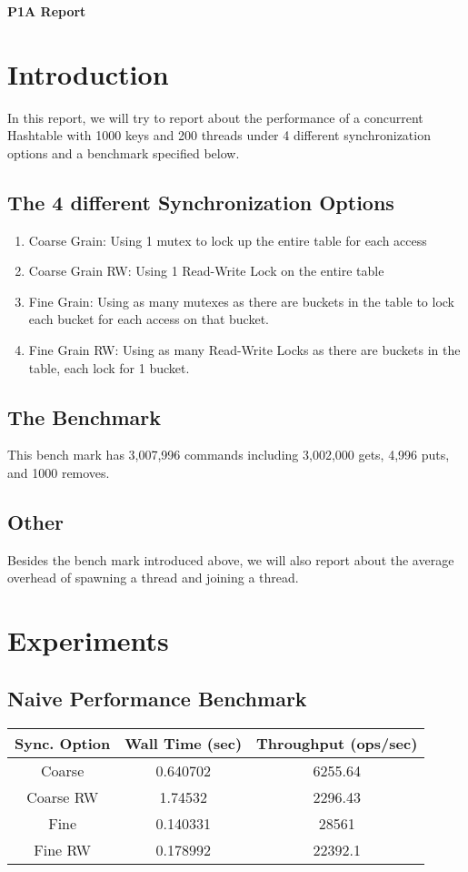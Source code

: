 \documentclass[11pt]{article}
\begin{document}
\centerline{\Large\textbf{P1A Report}}
\vspace{0.3cm}
\section{Introduction}
In this report, we will try to report about the performance of a concurrent Hashtable with 1000 keys and 200 threads under 4 different synchronization options and a benchmark specified below.
\subsection{The 4 different Synchronization Options}
\begin{enumerate}
	\item Coarse Grain: Using 1 mutex to lock up the entire table for each access
	\item Coarse Grain RW: Using 1 Read-Write Lock on the entire table
	\item Fine Grain: Using as many mutexes as there are buckets in the table to lock each bucket for each access on that bucket.
	\item Fine Grain RW: Using as many Read-Write Locks as there are buckets in the table, each lock for 1 bucket.
\end{enumerate}
\subsection{The Benchmark}
This bench mark has 3,007,996 commands including 3,002,000 gets, 4,996 puts, and 1000 removes.
\subsection{Other}
Besides the bench mark introduced above, we will also report about the average overhead of spawning a thread and joining a thread.
\section{Experiments}
\subsection{Naive Performance Benchmark}
\begin{table}[H]
	\centering
	\begin{tabular}{|c|c|c|}
		\hline
		Sync. Option &Wall Time (sec)	&Throughput (ops/sec)	\\
		\hline
		Coarse &0.640702	&6255.64\\
		\hline
		Coarse RW	&1.74532	&2296.43\\
		\hline
		Fine	&0.140331	&28561\\
		\hline
		Fine RW	&0.178992	&22392.1\\
		\hline
	\end{tabular}
\end{table}
\end{document}
